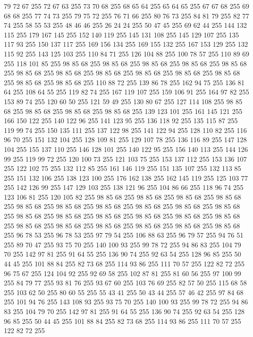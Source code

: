 79 72 67 255 72 67 63 255 73 70 68 255 68 65 64 255 65 64 65 255 67 67 68 255 69 68 68 255 77 74 73 255 79 75 72 255 76 71 66 255 80 76 73 255 84 81 79 255 82 77 74 255 58 55 53 255 48 46 46 255 26 24 24 255 50 47 45 255 69 62 44 255 144 132 115 255 179 167 145 255 152 140 119 255 145 131 108 255 145 129 107 255 135 117 93 255 150 137 117 255 169 156 134 255 169 155 132 255 167 153 129 255 132 115 92 255 143 125 103 255 110 84 71 255 126 104 88 255 100 78 57 255 110 89 69 255 118 101 85 255 98 85 68 255 98 85 68 255 98 85 68 255 98 85 68 255 98 85 68 255 98 85 68 255 98 85 68 255 98 85 68 255 98 85 68 255 98 85 68 255 98 85 68 255 98 85 68 255 98 85 68 255 110 88 72 255 139 86 78 255 162 94 75 255 136 81 64 255 108 64 55 255 119 82 74 255 167 119 107 255 159 106 91 255 164 97 82 255 153 89 74 255 120 60 50 255 121 59 49 255 130 80 67 255 127 114 108 255 98 85 68 255 98 85 68 255
98 85 68 255 98 85 68 255 139 123 101 255 161 145 121 255 166 150 122 255 140 122 96 255 141 123 95 255 136 118 92 255 135 115 87 255 119 99 74 255 150 135 111 255 137 122 98 255 141 122 94 255 128 110 82 255 116 96 70 255 151 132 104 255 128 109 81 255 129 107 78 255 136 116 89 255 147 128 104 255 155 137 110 255 146 128 101 255 140 122 95 255 156 140 113 255 144 126 99 255 119 99 72 255 120 100 73 255 121 103 75 255 153 137 112 255 153 136 107 255 122 102 75 255 132 112 85 255 161 146 119 255 151 135 107 255 132 113 85 255 151 132 106 255 138 123 100 255 176 162 138 255 162 145 119 255 125 103 77 255 142 126 99 255 147 129 103 255 138 121 96 255 104 86 66 255 118 96 74 255 123 106 81 255 120 105 82 255 98 85 68 255 98 85 68 255 98 85 68 255 98 85 68 255 98 85 68 255 98 85 68 255 98 85 68 255 98 85 68 255 98 85 68 255 98 85 68 255 98 85 68 255 98 85 68 255 98 85 68 255 98 85 68 255 98 85 68 255 98 85 68 255 98 85 68 255
98 85 68 255 98 85 68 255 98 85 68 255 98 85 68 255 98 85 68 255 96 78 53 255 96 78 53 255 97 79 54 255 106 88 63 255 96 79 57 255 94 76 51 255 89 70 47 255 93 75 70 255 140 100 93 255 99 78 72 255 94 86 83 255 104 79 70 255 142 97 81 255 91 64 55 255 136 90 74 255 92 63 54 255 128 96 85 255 50 44 45 255 101 88 84 255 82 73 68 255 114 93 86 255 111 70 57 255 122 82 72 255 96 75 67 255 124 104 92 255 92 69 58 255 102 87 81 255 81 60 56 255 97 100 99 255 84 79 77 255 93 81 76 255 93 67 60 255 103 76 69 255 82 57 50 255 115 68 58 255 103 62 50 255 80 60 55 255 55 43 41 255 50 43 44 255 57 46 42 255 97 84 68 255 101 94 76 255 143 108 93 255 93 75 70 255 140 100 93 255 99 78 72 255 94 86 83 255 104 79 70 255 142 97 81 255 91 64 55 255 136 90 74 255 92 63 54 255 128 96 85 255 50 44 45 255 101 88 84 255 82 73 68 255 114 93 86 255 111 70 57 255 122 82 72 255
